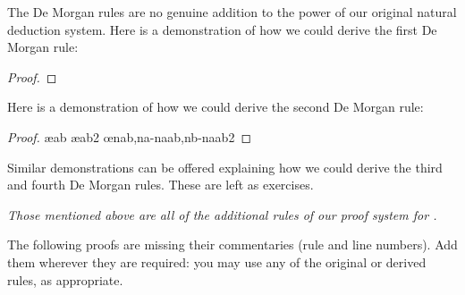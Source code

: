 \newpage
The De Morgan rules are no genuine addition to the power of our original natural deduction system. Here is a demonstration of how we could derive the first De Morgan rule:
 	\begin{proof}
		\open
			\open
			\close
			\open
			\close
		\close
	\end{proof}
Here is a demonstration of how we could derive the second De Morgan rule:
 	\begin{proof}
		\open
			\open
			\ae{ab}
			\close
			\close
			\open
			\open
			\ae{ab2}
			\close
			\close
		\oe{nab,na-naab,nb-naab2}
	\end{proof}
Similar demonstrations can be offered explaining how we could derive the third and fourth De Morgan rules. These are left as exercises.

\emph{Those mentioned above are all of the additional rules of our proof system for \TFL.}


\practiceproblems

\problempart
\label{pr.justifyTFLproof}
The following proofs are missing their commentaries (rule and line numbers). Add them wherever they are required: you may use any of the original or derived rules, as appropriate.

